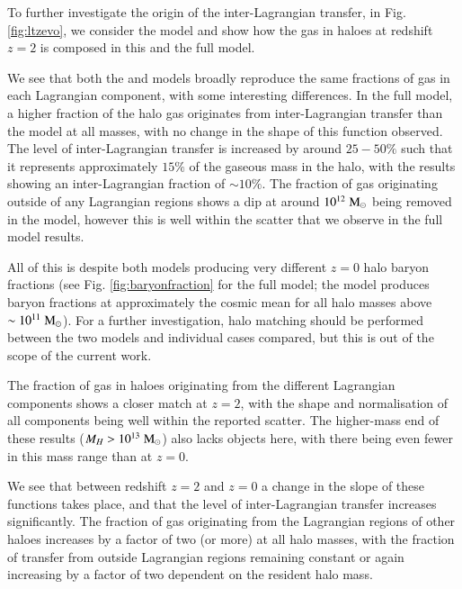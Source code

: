 To further investigate the origin of the inter-Lagrangian transfer, in Fig.
\ref{fig:ltzevo}, we consider the \nojet{} model and show how the gas in
haloes at redshift $z=2$ is composed in this and the full \simba{} model.

We see that both the \nojet{} and \simba{} models broadly reproduce the same
fractions of gas in each Lagrangian component, with some interesting
differences. In the full model, a higher fraction of the halo gas originates
from inter-Lagrangian transfer than the \nojet{} model at all masses, with no
change in the shape of this function observed. The level of inter-Lagrangian
transfer is increased by around $25-50\%$ such that it represents
approximately $15\%$ of the gaseous mass in the halo, with the \nojet{}
results showing an inter-Lagrangian fraction of $\sim10\%$. The fraction of
gas originating outside of any Lagrangian regions shows a dip at around
$10^{12}\;{\rm M}_{\odot}{}$ being removed in the \nojet{} model, however this is well
within the scatter that we observe in the full model results.

All of this is despite both models producing very different $z=0$ halo baryon
fractions (see Fig. \ref{fig:baryonfraction} for the full model; the \nojet{}
model produces baryon fractions at approximately the cosmic mean for all halo
masses above $\sim10^{11}\;{\rm M}_{\odot}{}$). For a further investigation, halo matching
should be performed between the two models and individual cases compared, but
this is out of the scope of the current work.

The fraction of gas in haloes originating from the different Lagrangian
components shows a closer match at $z=2$, with the shape and
normalisation of all components being well within the reported scatter. The
higher-mass end of these results ($M_H > 10^{13}\;{\rm M}_{\odot}{}$) also lacks
objects here, with there being even fewer in this mass range than at $z=0$.

We see that between redshift $z=2$ and $z=0$ a change in the slope
of these functions takes place, and that the level of inter-Lagrangian transfer
increases significantly. The fraction of gas originating from the Lagrangian 
regions of other haloes increases by a factor of two (or more) at all halo
masses, with the fraction of transfer from outside Lagrangian regions remaining
constant or again increasing by a factor of two dependent on the resident halo mass.

